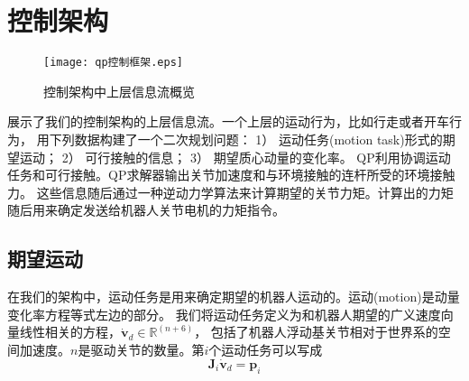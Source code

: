 \section{控制架构}
\label{sec:controller}
\begin{figure}[htbp]
    \centering
    \texttt{[image: qp控制框架.eps]}
    \caption{\label{fig:framework_control_flow}控制架构中上层信息流概览}
\end{figure}
展示了我们的控制架构的上层信息流。一个上层的运动行为，比如行走或者开车行为，
用下列数据构建了一个二次规划问题：
1）	运动任务(motion task)形式的期望运动；
2）	可行接触的信息；
3）	期望质心动量的变化率。
QP利用协调运动任务和可行接触。QP求解器输出关节加速度和与环境接触的连杆所受的环境接触力。
这些信息随后通过一种逆动力学算法来计算期望的关节力矩。计算出的力矩随后用来确定发送给机器人关节电机的力矩指令。
\subsection{期望运动}
在我们的架构中，运动任务是用来确定期望的机器人运动的。运动(motion)是动量变化率方程等式左边的部分。
我们将运动任务定义为和机器人期望的广义速度向量线性相关的方程，${\dot{\boldsymbol{v}}}_{d}\in {\mathbb{R}}^{(n+6)}$，
包括了机器人浮动基关节相对于世界系的空间加速度。$n$是驱动关节的数量。第$i$个运动任务可以写成
\begin{equation}
    \label{equ:motion_task}
    \boldsymbol{J}_i \dot {\boldsymbol{v}}_d = \boldsymbol{p}_i
\end{equation}


